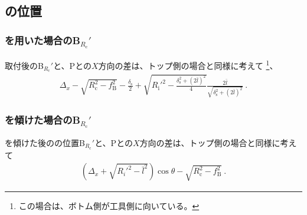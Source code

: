 \clearpage


\subsection{\BottomCurvatureCenter の位置}

\subsubsection{\Spacer を用いた場合のB\texorpdfstring{$_{R_\mathrm c}'$}{Rc'}}
\Spacer 取付後の\BottomCurvatureCenter B$_{R_\mathrm c}'$と、\TableCenter Pとの$X$方向の差は、トップ側の場合と同様に考えて
\footnote{この場合は、ボトム側が工具側に向いている。}、
\begin{align*}
  \Delta_x-\sqrt{R_\mathrm c^2-f_\mathrm B^2}-\frac{\delta_\mathrm s}2
  +\sqrt{R_\mathrm i'^2-\frac{\delta_\mathrm s^2+(2\bar l)^2}4}\frac{2\bar l}{\sqrt{\delta_\mathrm s^2+(2\bar l)^2}}\ .
\end{align*}

\subsubsection{\Table を傾けた場合のB\texorpdfstring{$_{R_\mathrm c}'$}{Rc'}}
\Table を傾けた後の\BottomCurvatureCenter の位置B$_{R_\mathrm c}'$と、\TableCenter Pとの$X$方向の差は、トップ側の場合と同様に考えて
\begin{align*}
  \left(\Delta_x+\sqrt{R_i'^2-\bar l^2}\right)\cos\theta-\sqrt{R_\mathrm c^2-f_\mathrm B^2}~.
\end{align*}


